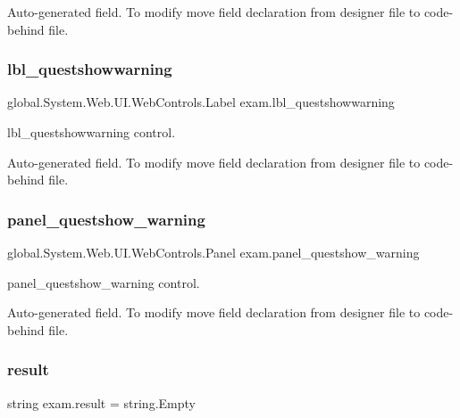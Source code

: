 Auto-\/generated field. To modify move field declaration from designer file to code-\/behind file. \mbox{\label{classexam_a2fa44d4bac2960721207e4407b978ac6}} 
\subsubsection{\texorpdfstring{lbl\_questshowwarning}{lbl\_questshowwarning}}
{\footnotesize\ttfamily global.\+System.\+Web.\+U\+I.\+Web\+Controls.\+Label exam.\+lbl\+\_\+questshowwarning\hspace{0.3cm}{\ttfamily [protected]}}



lbl\+\_\+questshowwarning control. 

Auto-\/generated field. To modify move field declaration from designer file to code-\/behind file. \mbox{\label{classexam_a6758dd187fa3ba3c78369feb5fb94b60}} 
\subsubsection{\texorpdfstring{panel\_questshow\_warning}{panel\_questshow\_warning}}
{\footnotesize\ttfamily global.\+System.\+Web.\+U\+I.\+Web\+Controls.\+Panel exam.\+panel\+\_\+questshow\+\_\+warning\hspace{0.3cm}{\ttfamily [protected]}}



panel\+\_\+questshow\+\_\+warning control. 

Auto-\/generated field. To modify move field declaration from designer file to code-\/behind file. \mbox{\label{classexam_a3d6a6de9a1d05e7763066597ceafabbb}} 
\subsubsection{\texorpdfstring{result}{result}}
{\footnotesize\ttfamily string exam.\+result = string.\+Empty\hspace{0.3cm}{\ttfamily [private]}}

\mbox{\label{classexam_ac6f839121cd7992e5c54d3b8b2711d0f}} 
